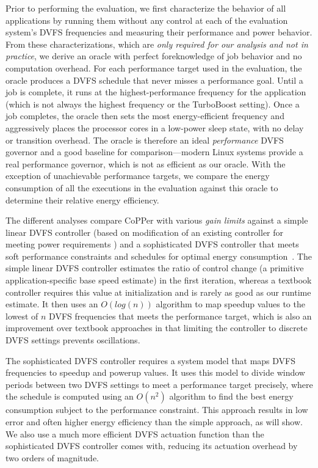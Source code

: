 Prior to performing the evaluation, we first characterize the behavior of all applications by running them without any control at each of the evaluation system's DVFS frequencies and measuring their performance and power behavior.
From these characterizations, which are \emph{only required for our analysis and not in practice}, we derive an oracle with perfect foreknowledge of job behavior and no computation overhead.
For each performance target used in the evaluation, the oracle produces a DVFS schedule that never misses a performance goal.
Until a job is complete, it runs at the highest-performance frequency for the application (which is not always the highest frequency or the TurboBoost setting).
Once a job completes, the oracle then sets the most energy-efficient frequency and aggressively places the processor cores in a low-power sleep state, with no delay or transition overhead.
The oracle is therefore an ideal \emph{performance} DVFS governor and a good baseline for comparison---modern Linux systems provide a real performance governor, which is not as efficient as our oracle.
With the exception of unachievable performance targets, we compare the energy consumption of all the executions in the evaluation against this oracle to determine their relative energy efficiency.

The different analyses compare CoPPer with various \emph{gain limits} against a simple linear DVFS controller (based on modification of an existing controller for meeting power requirements \cite{lefurgy2008power}) and a sophisticated DVFS controller that meets soft performance constraints and schedules for optimal energy consumption~\cite{POET}.
The simple linear DVFS controller estimates the ratio of control change (a primitive application-specific base speed estimate) in the first iteration, whereas a textbook controller requires this value at initialization and is rarely as good as our runtime estimate.
It then uses an $O(log(n))$ algorithm to map speedup values to the lowest of $n$ DVFS frequencies that meets the performance target, which is also an improvement over textbook approaches in that limiting the controller to discrete DVFS settings prevents oscillations.

The sophisticated DVFS controller requires a system model that maps DVFS frequencies to speedup and powerup values.
It uses this model to divide window periods between two DVFS settings to meet a performance target precisely, where the schedule is computed using an $O(n^2)$ algorithm to find the best energy consumption subject to the performance constraint.
This approach results in low error and often higher energy efficiency than the simple approach, as  will show.
We also use a much more efficient DVFS actuation function than the sophisticated DVFS controller comes with, reducing its actuation overhead by two orders of magnitude.

